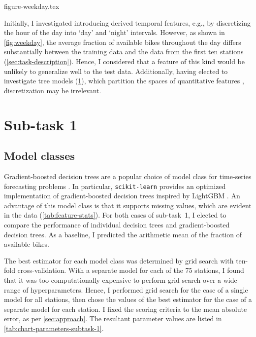 \documentclass[11pt]{extarticle}
\begin{document}
{figure-weekday.tex}

Initially, I investigated introducing derived temporal features, e.g., by discretizing
the hour of the day into `day' and `night' intervals.
However, as shown in \cref{fig:weekday}, the average fraction of available bikes
throughout the day differs substantially between the training data and the data from
the first ten stations (\cref{sec:task-description}).
Hence, I considered that a feature of this kind would be unlikely to generalize well to
the test data.
Additionally, having elected to investigate tree models (\cref{sec:subtask-1}), which
partition the spaces of quantitative features \parencite[155]{Flach2012},
discretization may be irrelevant.

\section{Sub-task 1}
\label{sec:subtask-1}

\subsection{Model classes}
\label{sec:subtask-1:model-classes}

Gradient-boosted decision trees are a popular choice of model class for time-series
forecasting problems \parencite{Bojer2021}.
In particular, \texttt{scikit-learn} provides an optimized implementation of
gradient-boosted decision trees inspired by LightGBM \parencite{Ke2017}.
An advantage of this model class is that it supports missing values, which are evident
in the data (\cref{tab:feature-stats}).
For both cases of sub-task~1, I elected to compare the performance of individual
decision trees and gradient-boosted decision trees.
As a baseline, I predicted the arithmetic mean of the fraction of available bikes.

The best estimator for each model class was determined by grid search with ten-fold
cross-validation.
With a separate model for each of the 75 stations, I found that it was too
computationally expensive to perform grid search over a wide range of hyperparameters.
Hence, I performed grid search for the case of a single model for all stations, then
chose the values of the best estimator for the case of a separate model for each
station.
I fixed the scoring criteria to the mean absolute error, as per \cref{sec:approach}.
The resultant parameter values are listed in \cref{tab:chart-parameters-subtask-1}.
\end{document}
